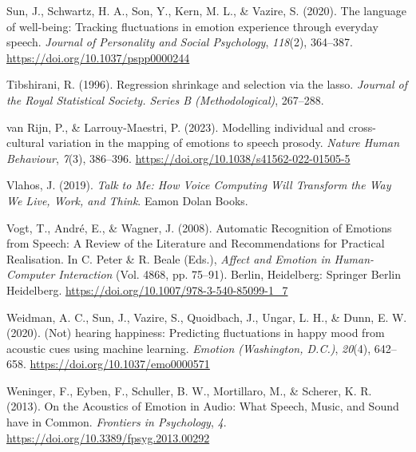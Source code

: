 \documentclass[
  english,
  man,floatsintext]{apa6}
\newlength{\cslhangindent}
\newenvironment{CSLReferences}[2] %
 {%
  \setlength{\parindent}{0pt}
  \ifodd #1 \everypar{\setlength{\hangindent}{\cslhangindent}}\ignorespaces\fi
  \ifnum #2 > 0
  \setlength{\parskip}{#2\baselineskip}
  \fi
 }%
 {}
\begin{document}
\begin{CSLReferences}{1}{0}
\leavevmode{}%
Sun, J., Schwartz, H. A., Son, Y., Kern, M. L., \& Vazire, S. (2020). The language of well-being: {Tracking} fluctuations in emotion experience through everyday speech. \emph{Journal of Personality and Social Psychology}, \emph{118}(2), 364--387. \url{https://doi.org/10.1037/pspp0000244}

\leavevmode{}%
Tibshirani, R. (1996). Regression shrinkage and selection via the lasso. \emph{Journal of the Royal Statistical Society. Series B (Methodological)}, 267--288.

\leavevmode{}%
van Rijn, P., \& Larrouy-Maestri, P. (2023). Modelling individual and cross-cultural variation in the mapping of emotions to speech prosody. \emph{Nature Human Behaviour}, \emph{7}(3), 386--396. \url{https://doi.org/10.1038/s41562-022-01505-5}

\leavevmode{}%
Vlahos, J. (2019). \emph{Talk to {Me}: {How Voice Computing Will Transform} the {Way We Live}, {Work}, and {Think}}. Eamon Dolan Books.

\leavevmode{}%
Vogt, T., André, E., \& Wagner, J. (2008). Automatic {Recognition} of {Emotions} from {Speech}: {A Review} of the {Literature} and {Recommendations} for {Practical Realisation}. In C. Peter \& R. Beale (Eds.), \emph{Affect and {Emotion} in {Human-Computer Interaction}} (Vol. 4868, pp. 75--91). Berlin, Heidelberg: Springer Berlin Heidelberg. \url{https://doi.org/10.1007/978-3-540-85099-1_7}

\leavevmode{}%
Weidman, A. C., Sun, J., Vazire, S., Quoidbach, J., Ungar, L. H., \& Dunn, E. W. (2020). ({Not}) hearing happiness: {Predicting} fluctuations in happy mood from acoustic cues using machine learning. \emph{Emotion (Washington, D.C.)}, \emph{20}(4), 642--658. \url{https://doi.org/10.1037/emo0000571}

\leavevmode{}%
Weninger, F., Eyben, F., Schuller, B. W., Mortillaro, M., \& Scherer, K. R. (2013). On the {Acoustics} of {Emotion} in {Audio}: {What Speech}, {Music}, and {Sound} have in {Common}. \emph{Frontiers in Psychology}, \emph{4}. \url{https://doi.org/10.3389/fpsyg.2013.00292}


\end{CSLReferences}
\end{document}
